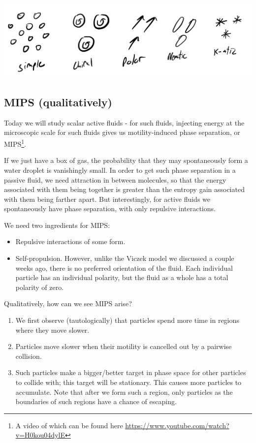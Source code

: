 \begin{center}
    \includegraphics[scale=0.4]{Lectures/Images/lec17-particles.png}
\end{center}

\subsection{MIPS (qualitatively)}
Today we will study scalar active fluids - for such fluids, injecting energy at the microscopic scale for such fluids gives us motility-induced phase separation, or MIPS\footnote{A video of which can be found here \url{https://www.youtube.com/watch?v=H0kou04dylE}}. 

If we just have a box of gas, the probability that they may spontaneously form a water droplet is vanishingly small. In order to get such phase separation in a passive fluid, we need attraction in between molecules, so that the energy associated with them being together is greater than the entropy gain associated with them being farther apart. But interestingly, for active fluids we spontaneously have phase separation, with only repulsive interactions.

We need two ingredients for MIPS:
\begin{itemize}
    \item Repulsive interactions of some form.
    \item Self-propulsion. However, unlike the Viczek model we discussed a couple weeks ago, there is no preferred orientation of the fluid. Each individual particle has an individual polarity, but the fluid as a whole has a total polarity of zero.
\end{itemize}

Qualitatively, how can we see MIPS arise? 
\begin{enumerate}
    \item We first observe (tautologically) that particles spend more time in regions where they move slower.
    \item Particles move slower when their motility is cancelled out by a pairwise collision.
    \item Such particles make a bigger/better target in phase space for other particles to collide with; this target will be stationary. This causes more particles to accumulate. Note that after we form such a region, only particles as the boundaries of such regions have a chance of escaping.
\end{enumerate}

